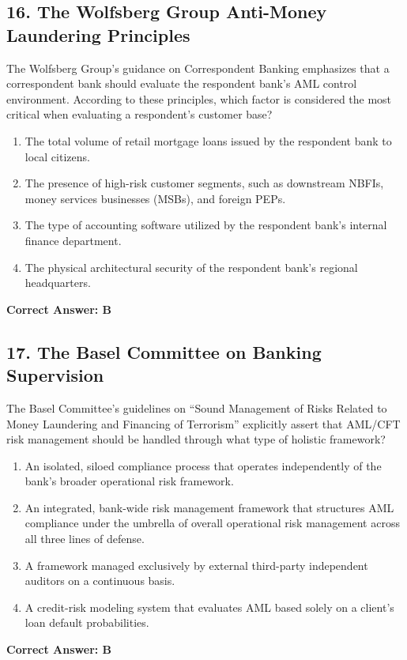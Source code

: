 \documentclass[11pt,a4paper]{article}
\begin{document}
	\subsection{16. The Wolfsberg Group Anti-Money Laundering Principles}
	The Wolfsberg Group’s guidance on Correspondent Banking emphasizes that a correspondent bank should evaluate the respondent bank’s AML control environment. According to these principles, which factor is considered the most critical when evaluating a respondent’s customer base?
	\begin{enumerate}[label=\Alph*.]
		\item The total volume of retail mortgage loans issued by the respondent bank to local citizens.
		\item The presence of high-risk customer segments, such as downstream NBFIs, money services businesses (MSBs), and foreign PEPs.
		\item The type of accounting software utilized by the respondent bank’s internal finance department.
		\item The physical architectural security of the respondent bank’s regional headquarters.
	\end{enumerate}
	\textbf{Correct Answer: B}
	
	\subsection{17. The Basel Committee on Banking Supervision}
	The Basel Committee's guidelines on ``Sound Management of Risks Related to Money Laundering and Financing of Terrorism'' explicitly assert that AML/CFT risk management should be handled through what type of holistic framework?
	\begin{enumerate}[label=\Alph*.]
		\item An isolated, siloed compliance process that operates independently of the bank’s broader operational risk framework.
		\item An integrated, bank-wide risk management framework that structures AML compliance under the umbrella of overall operational risk management across all three lines of defense.
		\item A framework managed exclusively by external third-party independent auditors on a continuous basis.
		\item A credit-risk modeling system that evaluates AML based solely on a client’s loan default probabilities.
	\end{enumerate}
	\textbf{Correct Answer: B}
	
\end{document}
